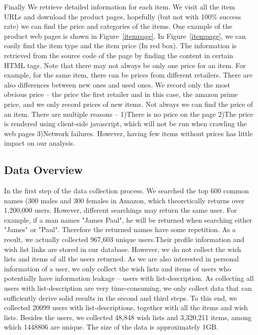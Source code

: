 \documentclass{llncs}
\begin{document}
Finally We retrieve detailed information for each item. We visit all the item URLs and download the product pages, hopefully (but not with 100\% success rate) we can find the price and categories of the items. One example of the product web pages is shown in Figure~\ref{itempage}. In Figure~\ref{itempage}, we can easily find the item type and the item price (In red box). The information is retrieved from the source code of the page by finding the content in certain HTML tags. Note that there may not always be only one price for an item. For example, for the same item, there can be prices from different retailers. There are also differences between new ones and used ones. We record only the most obvious price -- the price the first retailer and in this case, the amazon prime price, and we only record prices of new items. Not always we can find the price of an item. There are multiple reasons -- 1)There is no price on the page 2)The price is rendered using client-side javascript, which will not be run when crawling the web pages 3)Network failures. However, having few items without prices has little impact on our analysis.



\subsection{Data Overview}
In the first step of the data collection process. We searched the top 600 common names (300 males \cite{mnames} and 300 females \cite{fnames} in Amazon, which theoretically returns over 1,200,000 users. However, different searchings may return the same user. For example, if a man names "James Paul", he will be returned when searching either "James" or "Paul". Therefore the returned names have some repetition. As a result, we actually collected 967,603 unique users.Their profile information and wish list links are stored in our database. However, we do not collect the wish lists and items of all the users returned. As we are also interested in personal information of a user, we only collect the wish lists and items of users who potentially have information leakage -- users with list-description. As collecting all users with list-description are very time-consuming, we only collect data that can sufficiently derive solid results in the second and third steps. To this end, we collected 20099 users with list-descriptions, together with all the items and wish lists. Besides the users, we collected 48,848 wish lists and 3,320,211 items, among which 1448806 are unique. The size of the data is approximately 1GB. 
\end{document}
